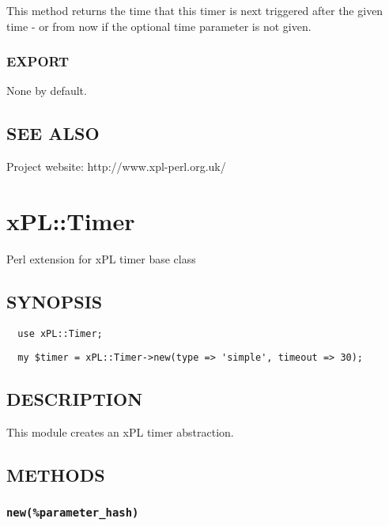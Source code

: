 \documentclass[12pt,a4paper]{article}
\begin{document}
This method returns the time that this timer is next triggered after
the given time - or from now if the optional time parameter is not
given.

\subsubsection*{EXPORT\label{xPL::Timer::cron_EXPORT}}


None by default.

\subsection*{SEE ALSO\label{xPL::Timer::cron_SEE_ALSO}}


Project website: http://www.xpl-perl.org.uk/

\newpage
\section{xPL::Timer\label{xPL::Timer}}


Perl extension for xPL timer base class

\subsection*{SYNOPSIS\label{xPL::Timer_SYNOPSIS}}
\begin{verbatim}
  use xPL::Timer;
\end{verbatim}
\begin{verbatim}
  my $timer = xPL::Timer->new(type => 'simple', timeout => 30);
\end{verbatim}
\subsection*{DESCRIPTION\label{xPL::Timer_DESCRIPTION}}


This module creates an xPL timer abstraction.

\subsection*{METHODS\label{xPL::Timer_METHODS}}
\subsubsection*{\texttt{new(\%parameter\_hash)}\label{xPL::Timer_new_parameter_hash_}}
\end{document}
